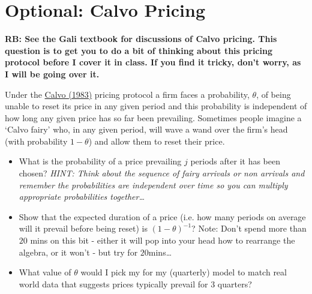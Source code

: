 \documentclass[authoryear,11pt]{elsarticle}
\begin{document}
\section{Optional: Calvo Pricing}
\textbf{RB: See the Gali textbook for discussions of Calvo pricing. This question is to get you to do a bit of thinking about this pricing protocol before I cover it in class. If you find it tricky, don't worry, as I will be going over it.}

Under the \href{https://www.sciencedirect.com/science/article/pii/0304393283900600}{Calvo (1983)} pricing protocol a firm faces a probability, $\theta$, of being unable to reset its price in any given period and this probability is independent of how long any given price has so far been prevailing. Sometimes people imagine a `Calvo fairy' who, in any given period, will wave a wand over the firm's head (with probability $1-\theta$) and allow them to reset their price.
\begin{itemize}
\item	What is the probability of a price prevailing $j$ periods after it has been chosen? \textit{HINT: Think about the sequence of fairy arrivals or non arrivals and remember the probabilities are independent over time so you can multiply appropriate probabilities together\ldots}
\item	Show that the expected duration of a price (i.e. how many periods on average will it prevail before being reset) is $(1-\theta)^{-1}$? Note: Don't spend more than $20$ mins on this bit - either it will pop into your head how to rearrange the algebra, or it won't - but try for $20$mins\ldots
\item	What value of $\theta$ would I pick my for my (quarterly) model to match real world data that suggests prices typically prevail for $3$ quarters?
\end{itemize}
\end{document}
